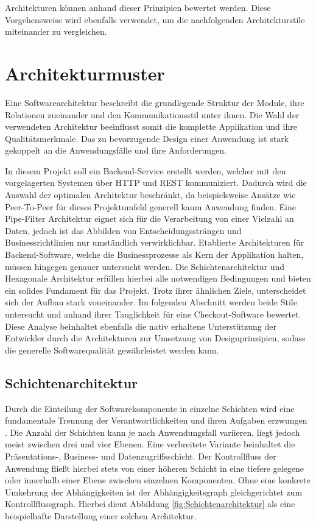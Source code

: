Architekturen können anhand dieser Prinzipien bewertet werden. Diese Vorgehensweise wird ebenfalls verwendet, um die nachfolgenden Architekturstile miteinander zu vergleichen. 

\section{Architekturmuster}

Eine Softwarearchitektur beschreibt die grundlegende Struktur der Module, ihre Relationen zueinander und den Kommunikationsstil unter ihnen. Die Wahl der verwendeten Architektur beeinflusst somit die komplette Applikation und ihre Qualitätsmerkmale. Das zu bevorzugende Design einer Anwendung ist stark gekoppelt an die Anwendungsfälle und ihre Anforderungen. 

In diesem Projekt soll ein Backend-Service erstellt werden, welcher mit den vorgelagerten Systemen über \acrshort{HTTP} und \acrshort{REST} kommuniziert. Dadurch wird die Auswahl der optimalen Architektur beschränkt, da beispielsweise Ansätze wie Peer-To-Peer für dieses Projektumfeld generell kaum Anwendung finden. Eine Pipe-Filter Architektur eignet sich für die Verarbeitung von einer Vielzahl an Daten, jedoch ist das Abbilden von Entscheidungssträngen und Businessrichtlinien nur umständlich verwirklichbar. Etablierte Architekturen für Backend-Software, welche die Businessprozesse als Kern der Applikation halten, müssen hingegen genauer untersucht werden. Die Schichtenarchitektur und Hexagonale Architektur erfüllen hierbei alle notwendigen Bedingungen und bieten ein solides Fundament für das Projekt. Trotz ihrer ähnlichen Ziele, unterscheidet sich der Aufbau  stark voneinander. Im folgenden Abschnitt werden beide Stile untersucht und anhand ihrer Tauglichkeit für eine Checkout-Software bewertet. Diese Analyse beinhaltet ebenfalls die nativ erhaltene Unterstützung der Entwickler durch die Architekturen zur Umsetzung von Designprinzipien, sodass die generelle Softwarequalität gewährleistet werden kann. 

\subsection{Schichtenarchitektur}

Durch die Einteilung der Softwarekomponente in einzelne Schichten wird eine fundamentale Trennung der Verantwortlichkeiten und ihren Aufgaben erzwungen \cite[S. 185]{Buschmann.2011}. Die Anzahl der Schichten kann je nach Anwendungsfall variieren, liegt jedoch meist zwischen drei und vier Ebenen. Eine verbreitete Variante beinhaltet die Präsentations-, Business- und Datenzugriffsschicht. Der Kontrollfluss der Anwendung fließt hierbei stets von einer höheren Schicht in eine tiefere gelegene oder innerhalb einer Ebene zwischen einzelnen Komponenten. Ohne eine konkrete Umkehrung der Abhängigkeiten ist der Abhängigkeitsgraph gleichgerichtet zum Kontrollflussgraph. \cite[S. 17]{Fowler.2011} Hierbei dient Abbildung \ref{fig:Schichtenarchitektur} als eine beispielhafte Darstellung einer solchen Architektur. 

